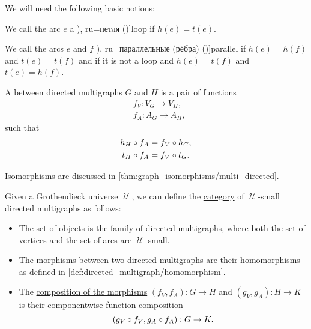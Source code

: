 \begin{definition}
  We will need the following basic notions:
  \begin{thmenum}[resume=def:directed_multigraph]
     We call the arc \( e \) a \term[bg=примка (\cite[7]{Мирчев2001Графи}), ru=петля (\cite[279]{ЕмеличевИПр1990ТеорияГрафов})]{loop} if \( h(e) = t(e) \).

    \medskip

     We call the arcs \( e \) and \( f \) \term[bg=паралелни (ребра) (\cite[7]{Мирчев2001Графи}), ru=параллельные (рёбра) (\cite[279]{ЕмеличевИПр1990ТеорияГрафов})]{parallel} if \( h(e) = h(f) \) and \( t(e) = t(f) \) and  if it is not a loop and \( h(e) = t(f) \) and \( t(e) = h(f) \).

     A  between directed multigraphs \( G \) and \( H \) is a pair of functions
    \begin{align*}
      &f_V: V_G \to V_H, \\
      &f_A: A_G \to A_H,
    \end{align*}
    such that
    \begin{align}
      h_H \bincirc f_A &= f_V \bincirc h_G, \label{eq:def:directed_multigraph/homomorphism/head} \\
      t_H \bincirc f_A &= f_V \bincirc t_G. \label{eq:def:directed_multigraph/homomorphism/tail}
    \end{align}

    Isomorphisms are discussed in \cref{thm:graph_isomorphisms/multi_directed}.

     Given a Grothendieck universe \( \mscrU \), we can define the \hyperref[def:category]{category} of \( \mscrU \)-small directed multigraphs as follows:
    \begin{itemize}
      \item The \hyperref[def:category/objects]{set of objects} is the family of directed multigraphs, where both the set of vertices and the set of arcs are \( \mscrU \)-small.

      \item The \hyperref[def:category/morphisms]{morphisms} between two directed multigraphs are their homomorphisms as defined in \cref{def:directed_multigraph/homomorphism}.

      \item The \hyperref[def:category/composition]{composition of the morphisms} \( (f_V, f_A): G \to H \) and \( (g_V, g_A): H \to K \) is their componentwise function composition
      \begin{equation*}
        (g_V \bincirc f_V, g_A \bincirc f_A): G \to K.
      \end{equation*}


\end{itemize}
\end{thmenum}
\end{definition}
